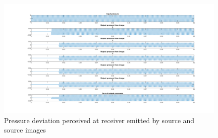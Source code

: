 \begin{figure}

    \centerline{\includegraphics[width=1.8\textwidth,keepaspectratio]{LaTeX/images/plots/matlab_4_walls_order_1.png}}
    \caption{Pressure deviation perceived at receiver emitted by source and source images}
    \label{fig:ism_4_1_mat}
\end{figure}
